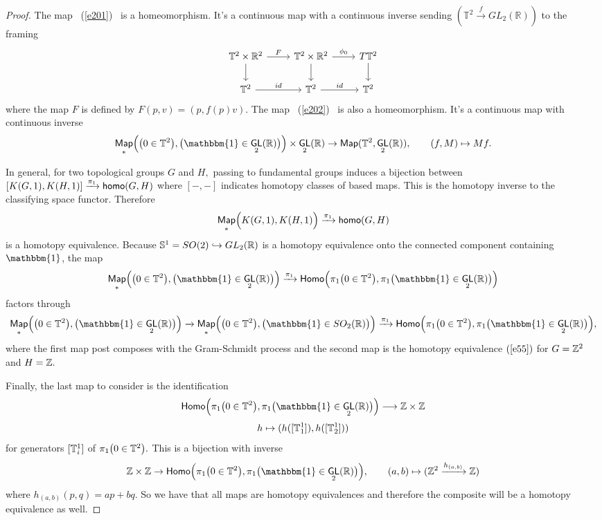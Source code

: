 \documentclass{amsart}
\theoremstyle{definition}
\theoremstyle{remark}
\DeclareMathOperator{\Map}{{\sf Map}}
\newcommand{\xra}{\xrightarrow}
\DeclareMathOperator{\uno}{\mathbbm{1}}
\DeclareMathOperator{\GL}{\sf GL}
\begin{document}
\begin{proof} 
The map ~(\ref{e201})~ is a homeomorphism. It's a continuous map with a continuous inverse sending $(\mathbb{T}^{2} \xrightarrow{f} GL_{2}(\mathbb{R}))$ to the framing  \[ \begin{tikzcd}
\mathbb{T}^{2} \times \mathbb{R}^{2} \arrow{r}{F} \arrow{d} & \mathbb{T}^{2} \times \mathbb{R}^{2} \arrow{r}{\phi_{0}} \arrow{d}{} & T\mathbb{T}^{2} \arrow{d} \\
\mathbb{T}^{2} \arrow{r}{id} & \mathbb{T}^{2}  \arrow{r}{id} & \mathbb{T}^{2}
\end{tikzcd} \]
where the map $F$ is defined by $F(p, v) = (p, f(p)v).$
The map ~(\ref{e202})~ is also a homeomorphism. It's a continuous map with continuous inverse $$ \Map_\ast \Bigl( \bigl( 0 \in \TT^2 \bigr) , \bigl( \uno \in \GL_2(\RR) \bigr) \Bigr) \times \GL_2(\RR) \rightarrow \Map(\mathbb{T}^{2}, \GL_{2}(\mathbb{R})), \qquad (f, M) \mapsto Mf.$$ 

In general, for two topological groups $G$ and $H,$ passing to fundamental groups induces a bijection between $[K(G, 1), K(H, 1)]  \xra{\pi_{1}} {\sf homo}(G, H)$ where $[-,-]$ indicates homotopy classes of based maps. This is the homotopy inverse to the classifying space functor. Therefore \begin{equation}\label{e55} \Map_{\ast}\Bigl(K(G, 1), K(H, 1) \Bigr) \xra{\pi_{1}} {\sf homo}(G, H) \end{equation} is a homotopy equivalence. Because $\mathbb S^{1} = SO(2) \hookrightarrow GL_{2}(\mathbb R)$ is a homotopy equivalence onto the connected component containing $\uno$, the map $$\Map_\ast \Bigl( \bigl( 0 \in \TT^2 \bigr) , \bigl( \uno \in \GL_2(\RR) \bigr) \Bigr) \xra{\pi_{1}} {\sf Homo}\Bigl( \pi_1\bigl( 0 \in \TT^2 \bigr) , \pi_1\bigl( \uno \in \GL_2(\RR) \bigr) \Bigr) $$ factors through 
$$\Map_\ast \Bigl( \bigl( 0 \in \TT^2 \bigr) , \bigl( \uno \in \GL_2(\RR) \bigr) \Bigr) \xra{} \Map_\ast \Bigl( \bigl( 0 \in \TT^2 \bigr) , \bigl( \uno \in SO_2(\RR) \bigr) \Bigr) \xra{\pi_{1}} {\sf Homo}\Bigl( \pi_1\bigl( 0 \in \TT^2 \bigr) , \pi_1\bigl( \uno \in \GL_2(\RR) \bigr) \Bigr),$$ where the first map post composes with the Gram-Schmidt process and the second map is the homotopy equivalence $(\ref{e55})$ for $G = \mathbb Z^{2}$ and $H = \mathbb Z.$


Finally, the last map to consider is the identification
\begin{equation} \label{e203}
{\sf Homo}\Bigl( \pi_1\bigl( 0 \in \TT^2 \bigr) , \pi_1\bigl( \uno \in \GL_2(\RR) \bigr) \Bigr) \longrightarrow \ZZ \times \ZZ
\end{equation}
$$h \mapsto (h([\mathbb T^{1}_{1}]), h([\mathbb T^{1}_{2}]))$$ for generators $[\mathbb T^{1}_{i}]$ of $\pi_1\bigl( 0 \in \mathbb T^2 \bigr).$ This is a bijection with inverse $$\ZZ \times \ZZ \rightarrow {\sf Homo}\Bigl( \pi_1\bigl( 0 \in \TT^2 \bigr) , \pi_1\bigl( \uno \in \GL_2(\RR) \bigr) \Bigr), \qquad (a, b) \mapsto (\ZZ^{2} \xra{h_{(a, b)}} \ZZ)$$ where $h_{(a, b)}(p, q) = ap + bq.$ So we have that all maps are homotopy equivalences and therefore the composite will be a homotopy equivalence as well. 
\end{proof}
\end{document}

